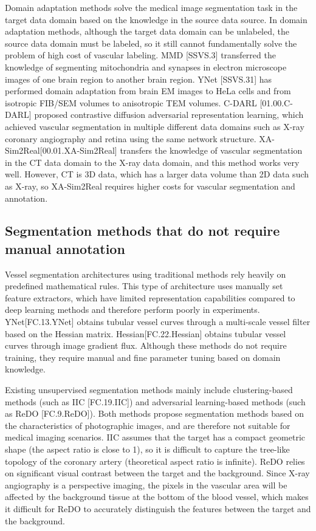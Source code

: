 Domain adaptation methods solve the medical image segmentation task in the target data domain based on the knowledge in the source data source. In domain adaptation methods, although the target data domain can be unlabeled, the source data domain must be labeled, so it still cannot fundamentally solve the problem of high cost of vascular labeling. MMD [SSVS.3] transferred the knowledge of segmenting mitochondria and synapses in electron microscope images of one brain region to another brain region. YNet [SSVS.31] has performed domain adaptation from brain EM images to HeLa cells and from isotropic FIB/SEM volumes to anisotropic TEM volumes. C-DARL [01.00.C-DARL] proposed contrastive diffusion adversarial representation learning, which achieved vascular segmentation in multiple different data domains such as X-ray coronary angiography and retina using the same network structure. XA-Sim2Real[00.01.XA-Sim2Real] transfers the knowledge of vascular segmentation in the CT data domain to the X-ray data domain, and this method works very well. However, CT is 3D data, which has a larger data volume than 2D data such as X-ray, so XA-Sim2Real requires higher costs for vascular segmentation and annotation.

\subsection{Segmentation methods that do not require manual annotation}

Vessel segmentation architectures using traditional methods rely heavily on predefined mathematical rules. This type of architecture uses manually set feature extractors, which have limited representation capabilities compared to deep learning methods and therefore perform poorly in experiments. YNet[FC.13.YNet] obtains tubular vessel curves through a multi-scale vessel filter based on the Hessian matrix. Hessian[FC.22.Hessian] obtains tubular vessel curves through image gradient flux. Although these methods do not require training, they require manual and fine parameter tuning based on domain knowledge.

Existing unsupervised segmentation methods mainly include clustering-based methods (such as IIC [FC.19.IIC]) and adversarial learning-based methods (such as ReDO [FC.9.ReDO]). Both methods propose segmentation methods based on the characteristics of photographic images, and are therefore not suitable for medical imaging scenarios. IIC assumes that the target has a compact geometric shape (the aspect ratio is close to 1), so it is difficult to capture the tree-like topology of the coronary artery (theoretical aspect ratio is infinite). ReDO relies on significant visual contrast between the target and the background. Since X-ray angiography is a perspective imaging, the pixels in the vascular area will be affected by the background tissue at the bottom of the blood vessel, which makes it difficult for ReDO to accurately distinguish the features between the target and the background.

